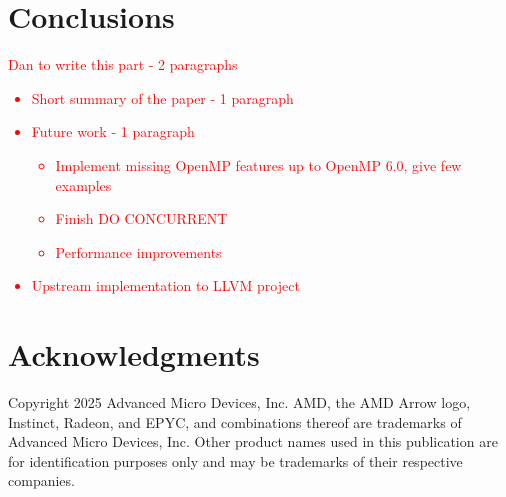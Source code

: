 \documentclass[acmtog,natbib=false]{acmart}
\newcommand{\todo}[1]{\textcolor{red}{#1}}
\begin{document}

\section{Conclusions}
\label{sec:Conclusions}

\todo{
Dan to write this part - 2 paragraphs
\begin{itemize}
    \item Short summary of the paper - 1 paragraph
    \item Future work - 1 paragraph
    \begin{itemize}
        \item Implement missing OpenMP features up to OpenMP 6.0, give few examples
        \item Finish DO CONCURRENT
        \item Performance improvements
    \end{itemize}
    \item Upstream implementation to LLVM project 
\end{itemize}
}




\section*{Acknowledgments}
Copyright 2025 Advanced Micro Devices, Inc.
AMD, the AMD Arrow logo, Instinct, Radeon, and EPYC, and combinations thereof are trademarks of Advanced Micro Devices, Inc.
Other product names used in this publication are for identification purposes only and may be trademarks of their respective companies.

\printbibliography
\end{document}
